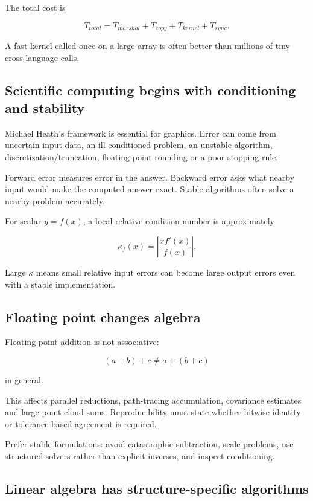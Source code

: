 The total cost is

\[
T_{total}=T_{marshal}+T_{copy}+T_{kernel}+T_{sync}.
\]

A fast kernel called once on a large array is often better than millions of tiny cross-language calls.

\subsection{Scientific computing begins with conditioning and stability}\label{01-foundations-i-ch017-scientific-computing-begins-with-conditioning-and-stability}

Michael Heath's framework is essential for graphics. Error can come from uncertain input data, an ill-conditioned problem, an unstable algorithm, discretization/truncation, floating-point rounding or a poor stopping rule.

Forward error measures error in the answer. Backward error asks what nearby input would make the computed answer exact. Stable algorithms often solve a nearby problem accurately.

For scalar \(y=f(x)\), a local relative condition number is approximately

\[
\kappa_f(x)=\left|\frac{x f'(x)}{f(x)}\right|.
\]

Large \(\kappa\) means small relative input errors can become large output errors even with a stable implementation.

\subsection{Floating point changes algebra}\label{01-foundations-i-ch017-floating-point-changes-algebra}

Floating-point addition is not associative:

\[
(a+b)+c\neq a+(b+c)
\]

in general.

This affects parallel reductions, path-tracing accumulation, covariance estimates and large point-cloud sums. Reproducibility must state whether bitwise identity or tolerance-based agreement is required.

Prefer stable formulations: avoid catastrophic subtraction, scale problems, use structured solvers rather than explicit inverses, and inspect conditioning.

\subsection{Linear algebra has structure-specific algorithms}\label{01-foundations-i-ch017-linear-algebra-has-structure-specific-algorithms}

